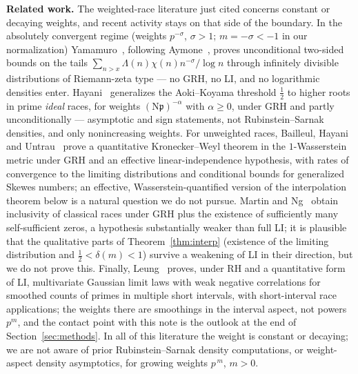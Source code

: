 \documentclass[11pt]{article}
\begin{document}
\medskip\noindent\textbf{Related work.} The weighted-race literature
just cited concerns constant or decaying weights, and recent activity
stays on that side of the boundary. In the absolutely convergent regime
(weights $p^{-\sigma}$, $\sigma>1$; $m=-\sigma<-1$ in our
normalization) Yamamuro~\cite{Yam25}, following Aymone~\cite{Aym22},
proves unconditional two-sided bounds on the tails
$\sum_{n>x}\Lambda(n)\chi(n)n^{-\sigma}/\log n$ through infinitely
divisible distributions of Riemann-zeta type --- no GRH, no LI, and no
logarithmic densities enter. Hayani~\cite{Hay26} generalizes the
Aoki--Koyama threshold $\tfrac12$ to higher roots in prime
\emph{ideal} races, for weights $(\mathrm N\mathfrak p)^{-\alpha}$
with $\alpha\ge0$, under GRH and partly unconditionally --- asymptotic
and sign statements, not Rubinstein--Sarnak densities, and only
nonincreasing weights. For unweighted races, Bailleul, Hayani and
Untrau~\cite{BHU26} prove a quantitative Kronecker--Weyl theorem in
the $1$-Wasserstein metric under GRH and an effective
linear-independence hypothesis, with rates of convergence to the
limiting distributions and conditional bounds for generalized Skewes
numbers; an effective, Wasserstein-quantified version of the
interpolation theorem below is a natural question we do not pursue.
Martin and Ng~\cite{MN20} obtain inclusivity of classical races under
GRH plus the existence of sufficiently many self-sufficient zeros, a
hypothesis substantially weaker than full LI; it is plausible that the
qualitative parts of Theorem~\ref{thm:interp} (existence of the
limiting distribution and $\tfrac12<\delta(m)<1$) survive a weakening
of LI in their direction, but we do not prove this. Finally,
Leung~\cite{Leung24} proves, under RH and a quantitative form of LI,
multivariate Gaussian limit laws with weak negative correlations for
smoothed counts of primes in multiple short intervals, with
short-interval race applications; the weights there are smoothings in
the interval aspect, not powers $p^m$, and the contact point with this
note is the outlook at the end of Section~\ref{sec:methods}. In all of
this literature the weight is constant or decaying; we are not aware
of prior Rubinstein--Sarnak density computations, or weight-aspect
density asymptotics, for growing weights $p^{\,m}$, $m>0$.
\end{document}
